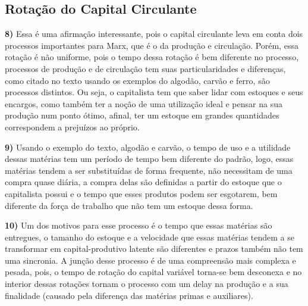 \documentclass[a4paper, 12pt]{article} %
\begin{document}
\vspace{0.5cm}


\begin{center}
\section{Rotação do Capital Circulante}
\end{center}

\par \textbf{8)} Essa é uma afirmação interessante, pois o capital circulante leva em conta dois processos importantes para Marx, que é o da produção e circulação. Porém, essa rotação é não uniforme, pois o tempo dessa rotação é bem diferente no processo, processos de produção e de circulação tem suas particularidades e diferenças, como citado no texto usando os exemplos do algodão, carvão e ferro, são processos distintos. Ou seja, o capitalista tem que saber lidar com estoques e seus encargos, como também ter a noção de uma utilização ideal e pensar na sua produção num ponto ótimo, afinal, ter um estoque em grandes quantidades correspondem a prejuízos ao próprio.

\vspace{0.5cm}

\par \textbf{9)} Usando o exemplo do texto, algodão e carvão, o tempo de uso e a utilidade dessas matérias tem um período de tempo bem diferente do padrão, logo, essas matérias tendem a ser substituídas de forma frequente, não necessitam de uma compra quase diária, a compra delas são definidas a partir do estoque que o capitalista possui e o tempo que esses produtos podem ser esgotarem, bem diferente da força de trabalho que não tem um estoque dessa forma.

\vspace{0.5cm}

\par \textbf{10)} Um dos motivos para esse processo é o tempo que essas matérias são entregues, o tamanho do estoque e a velocidade que essas matérias tendem a se transformar em capital-produtivo latente são diferentes e prazos também não tem uma sincronia. A junção desse processo é de uma compreensão mais complexa e pesada, pois, o tempo de rotação do capital variável torna-se bem desconexa e no interior dessas rotações tornam o processo com um delay na produção e a sua finalidade (causado pela diferença  das matérias primas e auxiliares).

\vspace{0.5cm}
\end{document}
